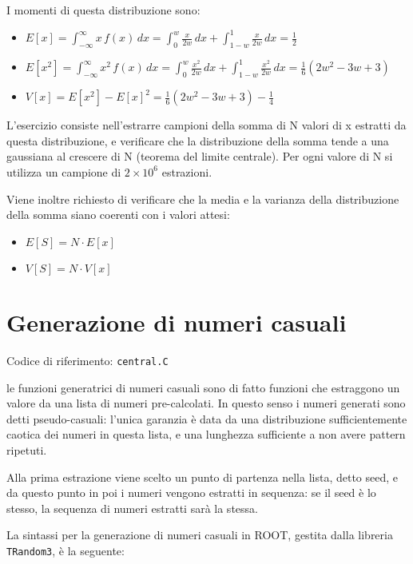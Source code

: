 \documentclass[10pt]{article}
\newcommand{\ttt}{\texttt}
\begin{document}
I momenti di questa distribuzione sono:
\begin{itemize}
    \item \(\displaystyle E[x]=\int_{-\infty}^{\infty} x\,f(x)\,dx=\int_0^w \frac{x}{2w}\,dx+\int_{1-w}^1 \frac{x}{2w}\,dx=\tfrac{1}{2}\)
    \item \(\displaystyle E[x^2]=\int_{-\infty}^{\infty} x^2\,f(x)\,dx=\int_0^w \frac{x^2}{2w}\,dx+\int_{1-w}^1 \frac{x^2}{2w}\,dx=\tfrac{1}{6}(2w^2-3w+3)\)
    \item \(\displaystyle V[x]=E[x^2]-E[x]^2=\tfrac{1}{6}(2w^2-3w+3)-\tfrac{1}{4}\)
\end{itemize}

\vspace{10pt}

L'esercizio consiste nell'estrarre campioni della somma di N valori di x estratti da questa distribuzione, e verificare che la distribuzione della somma tende a una gaussiana al crescere di N (teorema del limite centrale).
Per ogni valore di N si utilizza un campione di \(2 \times 10^6\) estrazioni.

Viene inoltre richiesto di verificare che la media e la varianza della distribuzione della somma siano coerenti con i valori attesi:
\begin{itemize}
    \item \(\displaystyle E[S] = N\cdot E[x] \)
    \item \(\displaystyle V[S] = N\cdot V[x] \)
\end{itemize}


\section{Generazione di numeri casuali}
Codice di riferimento: \ttt{central.C} \vspace{10pt}

le funzioni generatrici di numeri casuali sono di fatto funzioni che estraggono un valore da una lista di numeri pre-calcolati.
In questo senso i numeri generati sono detti pseudo-casuali: l'unica garanzia è data da una distribuzione sufficientemente caotica dei numeri in questa lista, e una lunghezza sufficiente a non avere pattern ripetuti.

Alla prima estrazione viene scelto un punto di partenza nella lista, detto seed, e da questo punto in poi i numeri vengono estratti in sequenza: se il seed è lo stesso, la sequenza di numeri estratti sarà la stessa.

La sintassi per la generazione di numeri casuali in ROOT, gestita dalla libreria \ttt{TRandom3}, è la seguente:
\end{document}
